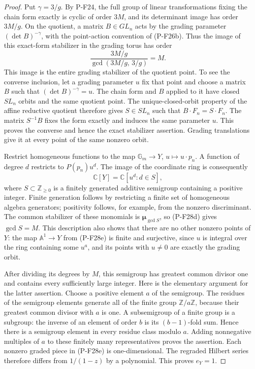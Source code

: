 \documentclass[11pt,a4paper]{article}
\begin{document}
\begin{proof}
Put $\gamma=3/g$. By P-F24, the full group of linear
transformations fixing the chain form exactly is cyclic
of order $3M$, and its determinant image has order
$3M/g$. On the quotient, a matrix $B\in GL_n$ acts by
the grading parameter $(\det B)^{-\gamma}$, with the
point-action convention of (P-F26b). Thus the image
of this exact-form stabilizer in the grading torus has
order
\[
 \frac{3M/g}{\gcd(3M/g,\,3/g)}=M.
 \tag{P-F28d}
\]
This image is the entire grading stabilizer of the
quotient point. To see the converse inclusion, let a
grading parameter $u$ fix that point and choose a
matrix $B$ such that $(\det B)^{-\gamma}=u$.
The chain form and $B$ applied to it have closed
$SL_n$ orbits and the same quotient point. The
unique-closed-orbit property of the affine reductive
quotient therefore gives $S\in SL_n$ such that
$B\cdot F_n=S\cdot F_n$. The matrix $S^{-1}B$
fixes the form exactly and induces the same parameter
$u$. This proves the converse and hence the exact
stabilizer assertion. Grading translations give it
at every point of the same nonzero orbit.

Restrict homogeneous functions to the map
$\mathbb G_m\to Y$, $u\mapsto u\cdot p_n$.
A function of degree $d$ restricts to $P(p_n)u^d$.
The image of the coordinate ring is consequently
\[
 \mathbb C[Y]=\mathbb C[u^d:d\in S],
 \tag{P-F28e}
\]
where $S\subset\mathbb Z_{\ge0}$ is a finitely generated
additive semigroup containing a positive integer.
Finite generation follows by restricting a finite
set of homogeneous algebra generators; positivity
follows, for example, from the nonzero discriminant.
The common stabilizer of these monomials is
$\boldsymbol\mu_{\gcd S}$, so (P-F28d) gives
$\gcd S=M$.
This description also shows that there are no other
nonzero points of $Y$: the map $\mathbb A^1\to Y$
from (P-F28e) is finite and surjective, since $u$
is integral over the ring containing some $u^a$,
and its points with $u\ne0$ are exactly the grading
orbit.

After dividing its degrees by $M$, this semigroup
has greatest common divisor one and contains every
sufficiently large integer. Here is the elementary
argument for the latter assertion. Choose a positive
element $a$ of the semigroup. The residues of the
semigroup elements generate all of the finite group
$\mathbb Z/a\mathbb Z$, because their greatest common
divisor with $a$ is one. A subsemigroup of a finite
group is a subgroup: the inverse of an element of
order $b$ is its $(b-1)$-fold sum. Hence there is a
semigroup element in every residue class modulo $a$.
Adding nonnegative multiples of $a$ to these finitely
many representatives proves the assertion. Each
nonzero graded piece in (P-F28e) is one-dimensional.
The regraded Hilbert series therefore differs from
$1/(1-z)$ by a polynomial. This proves $e_Y=1$.


\end{proof}
\end{document}
